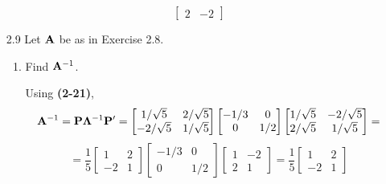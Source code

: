 \begin{enumerate}[font=\bfseries]
\[\begin{bmatrix}
                2 & -2
            \end{bmatrix}
        \]
        \item[2.9] Let $\bold{A}$ be as in Exercise 2.8.
        \begin{enumerate}
            \item Find $\bold{A}^{-1}$.
            \par
            Using \textbf{(2-21)}, 
            \[
                \bold{A}^{-1}
                =
                \bold{P}\bold{\Lambda}^{-1}\bold{P}^\prime
                =
                \begin{bmatrix}
                    1/\sqrt{5} & 2/\sqrt{5} \\
                    -2/\sqrt{5} & 1/\sqrt{5}
                \end{bmatrix}
                \begin{bmatrix}
                    -1/3 & 0 \\
                    0 & 1/2
                \end{bmatrix}
                \begin{bmatrix}
                    1/\sqrt{5} & -2/\sqrt{5} \\
                    2/\sqrt{5} & 1/\sqrt{5}
                \end{bmatrix}
                =
            \]
            \[
                =
                \frac{1}{5}
                \begin{bmatrix}
                    1 & 2 \\
                    -2 & 1
                \end{bmatrix}
                \begin{bmatrix}
                    -1/3 & 0 \\
                    0 & 1/2
                \end{bmatrix}
                \begin{bmatrix}
                    1 & -2 \\
                    2 & 1
                \end{bmatrix}
                =
                \frac{1}{5}
                \begin{bmatrix}
                    1 & 2 \\
                    -2 & 1
                \end{bmatrix}
\]
\end{enumerate}
\end{enumerate}
